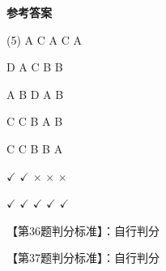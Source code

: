 \documentclass[11pt, a4paper]{article}
\begin{document}
\begin{center}
    \Huge \textbf{参考答案}
\end{center}

    \begin{tasks}[label=\arabic*. , label-width=14pt](5)
        \task A
        \task C
        \task A
        \task C
        \task A

        \task D
        \task A
        \task C
        \task B
        \task B

        \task A
        \task B
        \task D
        \task A
        \task B

        \task C
        \task C
        \task B
        \task A
        \task B

        \task C
        \task C
        \task B
        \task B
        \task A

        \task $\checkmark$
        \task $\checkmark$
        \task $\times$
        \task $\times$
        \task $\times$

        \task $\checkmark$
        \task $\checkmark$
        \task $\checkmark$
        \task $\checkmark$
        \task $\checkmark$
    \end{tasks}

    【第36题判分标准】：自行判分

    【第37题判分标准】：自行判分
\end{document}
